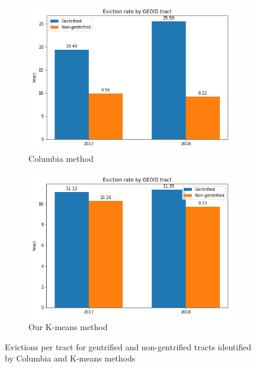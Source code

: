 \begin{figure}[h]
\centering
\begin{subfigure}{.5\textwidth}
  \centering
  \includegraphics[width=1.0\linewidth]{figs/columbia_evictions.png}
  \caption{Columbia method}
  \label{columbia_evictions}
\end{subfigure}%
\begin{subfigure}{.5\textwidth}
  \centering
  \includegraphics[width=1.0\linewidth]{figs/k_means_evictions.png}
  \caption{Our K-means method}
  \label{k_means_evictions}
\end{subfigure}
\caption{Evictions per tract for gentrified and non-gentrified tracts identified by Columbia and K-means methods}
\label{evictions}
\end{figure}

